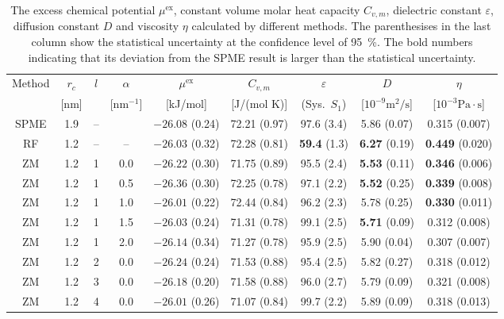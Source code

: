 \documentclass[aip,jcp,a4paper,preprint,unsortedaddress,onecolumn,fleqn]{revtex4-1}
\newcommand{\eps}{\varepsilon}
\newcommand{\exc}{\textrm{ex}}
\newcommand{\systemsb}{S_1}
\begin{document}
\begin{table}
  \centering
  \caption{The excess chemical potential $\mu^\exc$, constant volume molar heat capacity $C_{v,m}$, dielectric constant $\eps$, diffusion constant $D$ and viscosity $\eta$
    calculated by different methods.    
    The parenthesises in the last column show the statistical uncertainty
    at the confidence level of 95~\%.
    The bold numbers indicating that its deviation from the SPME result is larger than the statistical uncertainty.
  }
  \begin{tabular*}{0.95\textwidth}{@{\extracolsep{\fill}}cccc ccccc}\hline\hline
    Method      &   $r_c$ &    $l$ & $\alpha$  & $\mu^\exc$  &$C_{v,m}$ &  $\eps$ & $D$ &  $\eta$ \\
                &    [nm] &        & [$\textrm{nm}^{-1}$] &   [kJ/mol] &[J/(mol K)] & (Sys.~$\systemsb$) & [$10^{-9}\textrm{m}^2/\textrm{s}$] &  [$10^{-3}\textrm{Pa}\cdot\textrm{s}$] \\\hline
    SPME        &1.9 & -- &    & $-26.08$ (0.24) & 72.21 (0.97)  & 97.6 (3.4)  & 5.86 (0.07)   & 0.315 (0.007)\\
    RF          &1.2 & -- &--  & $-26.03$ (0.32) & 72.28 (0.81)  & \textbf{59.4} (1.3)  & \textbf{6.27} (0.19)   & \textbf{0.449} (0.020)\\\hline
    ZM          &1.2 & 1  &0.0 & $-26.22$ (0.30) & 71.75 (0.89)  & 95.5 (2.4)  & \textbf{5.53} (0.11)   & \textbf{0.346} (0.006)\\ 
    ZM          &1.2 & 1  &0.5 & $-26.36$ (0.30) & 72.25 (0.78)  & 97.1 (2.2)  & \textbf{5.52} (0.25)   & \textbf{0.339} (0.008)\\ 
    ZM          &1.2 & 1  &1.0 & $-26.01$ (0.22) & 72.44 (0.84)  & 96.2 (2.3)  &        {5.78} (0.25)   & \textbf{0.330} (0.011)\\ 
    ZM          &1.2 & 1  &1.5 & $-26.03$ (0.24) & 71.31 (0.78)  & 99.1 (2.5)  & \textbf{5.71} (0.09)   &        {0.312} (0.008)\\ 
    ZM          &1.2 & 1  &2.0 & $-26.14$ (0.34) & 71.27 (0.78)  & 95.9 (2.5)  &        {5.90} (0.04)   &        {0.307} (0.007)\\ \hline
    ZM          &1.2 & 2  &0.0 & $-26.24$ (0.24) & 71.53 (0.88)  & 95.4 (2.5)  & 5.82 (0.27)   & 0.318 (0.012)\\ 
    ZM          &1.2 & 3  &0.0 & $-{26.18}$ (0.20) & 71.58 (0.88)  & 96.0 (2.7)  & 5.79 (0.09)   & 0.321 (0.008)\\ 
    ZM          &1.2 & 4  &0.0 & $-{26.01}$ (0.26) & 71.07 (0.84)  & 99.7 (2.2)  & 5.89 (0.09)   & 0.318 (0.013)\\
    \hline\hline
  \end{tabular*}
  \label{tab:tmp3}
\end{table}
\end{document}
